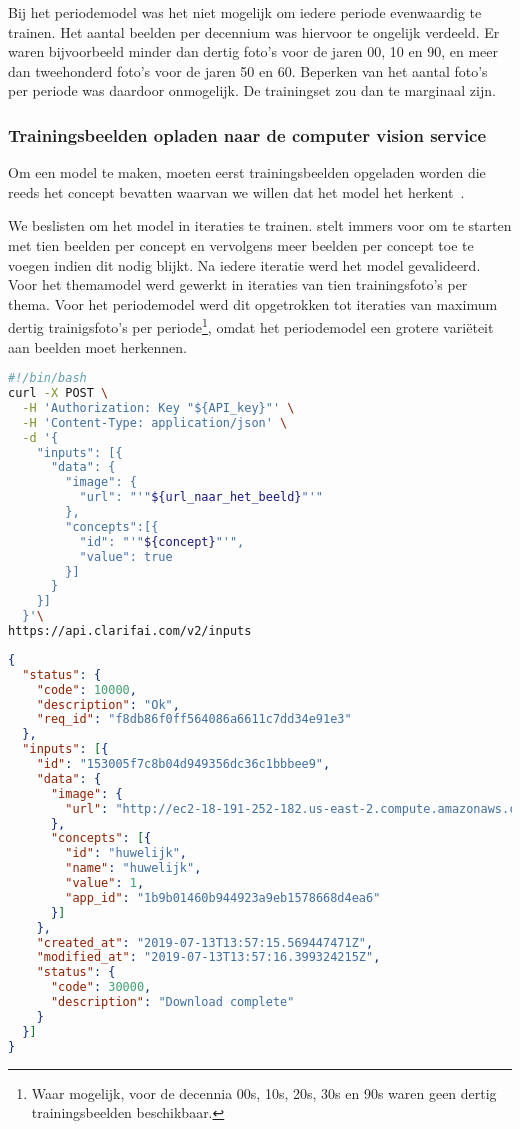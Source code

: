 Bij het periodemodel was het niet mogelijk om iedere periode evenwaardig te trainen. Het aantal beelden per decennium was hiervoor te ongelijk verdeeld. Er waren bijvoorbeeld minder dan dertig foto’s voor de jaren 00, 10 en 90, en meer dan tweehonderd foto’s voor de jaren 50 en 60. Beperken van het aantal foto’s per periode was daardoor onmogelijk. De trainingset zou dan  te marginaal zijn.

\subsubsection{Trainingsbeelden opladen naar de computer vision service}
\label{subsubsec:trainingsbeelden-opladen}

Om een model te maken, moeten eerst trainingsbeelden opgeladen worden die reeds het concept bevatten waarvan we willen dat het model het herkent~\autocite{ClarifaiAPI}. 

We beslisten om het model in iteraties te trainen. \textcite{ClarifaiAPI} stelt immers voor om te starten met tien beelden per concept en vervolgens meer beelden per concept toe te voegen indien dit nodig blijkt. Na iedere iteratie werd het model gevalideerd. Voor het themamodel werd gewerkt in iteraties van tien trainingsfoto’s per thema. Voor het periodemodel werd dit opgetrokken tot iteraties van maximum dertig trainigsfoto’s per periode\footnote{Waar mogelijk, voor de decennia 00s, 10s, 20s, 30s en 90s waren geen dertig trainingsbeelden beschikbaar.}, omdat het periodemodel een grotere variëteit aan beelden moet herkennen.




\begin{lstlisting}[language=bash,caption=bash commando om een beeld met een concept naar Clarifai op te laden.]
#!/bin/bash
curl -X POST \
  -H 'Authorization: Key "${API_key}"' \
  -H 'Content-Type: application/json' \
  -d '{
    "inputs": [{
      "data": {
        "image": {
          "url": "'"${url_naar_het_beeld}"'"
        },
        "concepts":[{
          "id": "'"${concept}"'",
          "value": true
        }]
      }
    }]
  }'\
https://api.clarifai.com/v2/inputs
\end{lstlisting}

\begin{lstlisting}[language=json,caption=Het antwoord van de Computer Vision API in JSON na het opladen van een beeld met een concept]
{
  "status": {
    "code": 10000,
    "description": "Ok",
    "req_id": "f8db86f0ff564086a6611c7dd34e91e3"
  },
  "inputs": [{
    "id": "153005f7c8b04d949356dc36c1bbbee9",
    "data": {
      "image": {
        "url": "http://ec2-18-191-252-182.us-east-2.compute.amazonaws.com:8182/iiif/2/2003-036-018/full/922,/0/default.jpg"
      },
      "concepts": [{
        "id": "huwelijk",
        "name": "huwelijk",
        "value": 1,
        "app_id": "1b9b01460b944923a9eb1578668d4ea6"
      }]
    },
    "created_at": "2019-07-13T13:57:15.569447471Z",
    "modified_at": "2019-07-13T13:57:16.399324215Z",
    "status": {
      "code": 30000,
      "description": "Download complete"
    }
  }]
}
\end{lstlisting}

